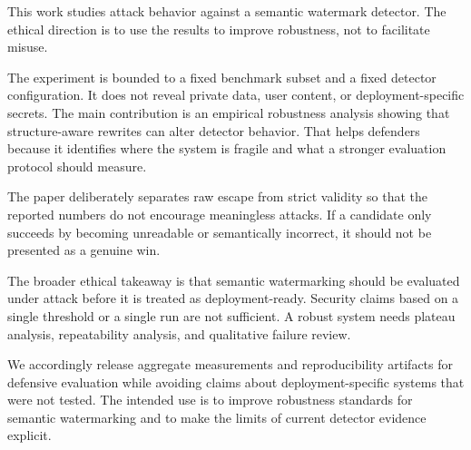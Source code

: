 This work studies attack behavior against a semantic watermark detector. The ethical direction is to use the results to improve robustness, not to facilitate misuse.

The experiment is bounded to a fixed benchmark subset and a fixed detector configuration. It does not reveal private data, user content, or deployment-specific secrets. The main contribution is an empirical robustness analysis showing that structure-aware rewrites can alter detector behavior. That helps defenders because it identifies where the system is fragile and what a stronger evaluation protocol should measure.

The paper deliberately separates raw escape from strict validity so that the reported numbers do not encourage meaningless attacks. If a candidate only succeeds by becoming unreadable or semantically incorrect, it should not be presented as a genuine win.

The broader ethical takeaway is that semantic watermarking should be evaluated under attack before it is treated as deployment-ready. Security claims based on a single threshold or a single run are not sufficient. A robust system needs plateau analysis, repeatability analysis, and qualitative failure review.

We accordingly release aggregate measurements and reproducibility artifacts for defensive evaluation while avoiding claims about deployment-specific systems that were not tested. The intended use is to improve robustness standards for semantic watermarking and to make the limits of current detector evidence explicit.
